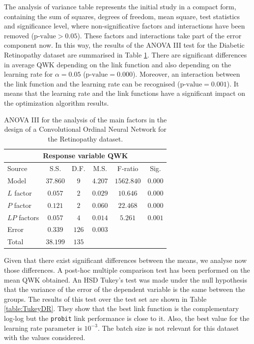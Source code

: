 \documentclass[journal]{IEEEtran}
\begin{document}
	The analysis of variance table represents the initial study in a compact form, containing the sum of squares, degrees of freedom, mean square, test statistics and significance level, where non-significative factors and interactions have been removed ($\text{p-value} > 0.05$). These factors and interactions take part of the error component now. In this way, the results of the ANOVA III test for the Diabetic Retinopathy dataset are summarised in Table  \ref{table:ANOVARetinopathy}. There are significant differences in average QWK depending on the link function and also depending on the learning rate for $\alpha=0.05$ ($\text{p-value} = 0.000$). Moreover, an interaction between the link function and the learning rate can be recognised ($\text{p-value} = 0.001$). It means that the learning rate and the link functions have a significant impact on the optimization algorithm results.
		
	\begin{table}[!t]
		\caption{ANOVA III for the analysis of the main factors in the design of a Convolutional Ordinal Neural Network for the Retinopathy dataset.}
		\label{table:ANOVARetinopathy}
		\centering
		\small
		\begin{tabular}{lccccc}
			\hline
			\hline
			           \multicolumn{6}{c}{Response variable QWK}             \\ \hline
			Source       &   S.S.   & D.F.  &  M.S.   &  F-ratio   &  Sig.   \\ \hline
			Model        & $37.860$ &  $9$  & $4.207$ & $1562.840$ & $0.000$ \\
			$L$ factor   & $0.057$  &  $2$  & $0.029$ &  $10.646$  & $0.000$ \\
			$P$ factor   & $0.121$  &  $2$  & $0.060$ &  $22.468$  & $0.000$ \\
			$LP$ factors & $0.057$  &  $4$  & $0.014$ &  $5.261$   & $0.001$ \\
			Error        & $0.339$  & $126$ & $0.003$ &            &  \\ \hline
			Total        & $38.199$ & $135$ &         &            & \\
			\hline
			\hline
		\end{tabular}
	\end{table}
	
	Given that there exist significant differences between the means, we analyse now those differences. A post-hoc multiple comparison test has been performed on the mean QWK obtained. An HSD Tukey's test \cite{tukey1949comparing} was made under the null hypothesis that the variance of the error of the dependent variable is the same between the groups. The results of this test over the test set are shown in Table \ref{table:TukeyDR}. They show that the best link function is the complementary log-log but the \texttt{probit} link performance is close to it. Also, the best value for the learning rate parameter is $10^{-3}$. The batch size is not relevant for this dataset with the values considered.
		
\end{document}
